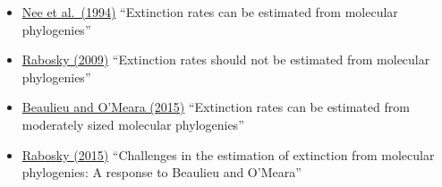 \documentclass[]{article}
\providecommand{\tightlist}{%
  \setlength{\itemsep}{0pt}\setlength{\parskip}{0pt}}
\begin{document}
\begin{itemize}
\tightlist
\item
  \href{http://rstb.royalsocietypublishing.org/content/344/1307/77}{Nee et al.~(1994)} ``Extinction rates can be estimated from molecular phylogenies''
\item
  \href{http://onlinelibrary.wiley.com/doi/10.1111/j.1558-5646.2009.00926.x/abstract}{Rabosky (2009)} ``Extinction rates should not be estimated from molecular phylogenies''
\item
  \href{http://onlinelibrary.wiley.com/doi/10.1111/evo.12614/abstract}{Beaulieu and O'Meara (2015)} ``Extinction rates can be estimated from moderately sized molecular phylogenies''
\item
  \href{http://onlinelibrary.wiley.com/doi/10.1111/evo.12820/full}{Rabosky (2015)} ``Challenges in the estimation of extinction from molecular phylogenies: A response to Beaulieu and O'Meara''
\end{itemize}
\end{document}
